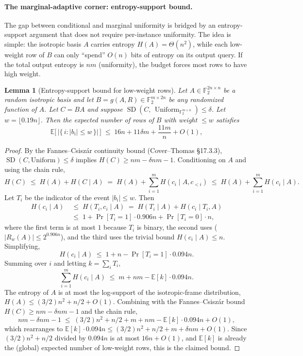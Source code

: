 \documentclass[11pt,a4paper]{article}
\theoremstyle{plain}
\newtheorem{lemma}[theorem]{Lemma}
\theoremstyle{definition}
\newcommand{\F}{\mathbb{F}}
\newcommand{\E}{\mathbb{E}}
\begin{document}
\paragraph{The marginal-adaptive corner: entropy-support bound.}
The gap between conditional and marginal uniformity is bridged by an entropy-support argument that does not require per-instance uniformity.  The idea is simple: the isotropic basis $A$ carries entropy $H(A)=\Theta(n^{2})$, while each low-weight row of $B$ can only ``spend'' $O(n)$ bits of entropy on its output query.  If the total output entropy is $nm$ (uniformity), the budget forces most rows to have high weight.

\begin{lemma}[Entropy-support bound for low-weight rows]
\label{lem:m1}
Let $A\in\F_2^{2n\times n}$ be a random isotropic basis and let $B=g(A,R)\in\F_2^{m\times 2n}$ be any randomized function of $A$.  Let $C=BA$ and suppose $\operatorname{SD}(C,\,\operatorname{Uniform}_{\F_2^{m\times n}})\le\delta$.  Let $w=\lfloor 0.19n\rfloor$.  Then the expected number of rows of $B$ with weight $\le w$ satisfies
\[
\E\bigl[\,\bigl|\{\,i:|b_i|\le w\,\}\bigr|\,\bigr]
\;\le\;
16n+11\delta m+\frac{11m}{n}+O(1),
\]
\end{lemma}

\begin{proof}
By the Fannes--Csisz\'{a}r continuity bound (Cover--Thomas \S17.3.3), $\operatorname{SD}(C,\text{Uniform})\le\delta$ implies $H(C)\ge nm-\delta nm-1$.  Conditioning on $A$ and using the chain rule,
\[
H(C)\;\le\;H(A)+H(C\mid A)\;=\;H(A)+\sum_{i=1}^{m}H(c_i\mid A,c_{<i})
\;\le\;H(A)+\sum_{i=1}^{m}H(c_i\mid A).
\]
Let $T_i$ be the indicator of the event $|b_i|\le w$.  Then
\begin{align*}
H(c_i\mid A)
&\;\le\;H(T_i,c_i\mid A)
\;=\;H(T_i\mid A)+H(c_i\mid T_i,A) \\
&\;\le\;1+\Pr[T_i=1]\cdot0.906n+\Pr[T_i=0]\cdot n,
\end{align*}
where the first term is at most $1$ because $T_i$ is binary, the second uses  ($|R_w(A)|\le2^{0.906n}$), and the third uses the trivial bound $H(c_i\mid A)\le n$.  Simplifying,
\[
H(c_i\mid A)\;\le\;1+n-\Pr[T_i=1]\cdot0.094n.
\]
Summing over $i$ and letting $k=\sum_i T_i$,
\[
\sum_{i=1}^{m}H(c_i\mid A)
\;\le\;m+nm-\E[k]\cdot0.094n.
\]
The entropy of $A$ is at most the log-support of the isotropic-frame distribution, $H(A)\le (3/2)n^{2}+n/2+O(1)$.  Combining with the Fannes--Csisz\'{a}r bound $H(C)\ge nm-\delta nm-1$ and the chain rule,
\[
nm-\delta nm-1
\;\le\;(3/2)n^{2}+n/2+m+nm-\E[k]\cdot0.094n+O(1),
\]
which rearranges to $\E[k]\cdot0.094n\le(3/2)n^{2}+n/2+m+\delta nm+O(1)$.  Since $(3/2)n^{2}+n/2$ divided by $0.094n$ is at most $16n+O(1)$, and $\E[k]$ is already the (global) expected number of low-weight rows, this is the claimed bound.
\end{proof}
\end{document}
